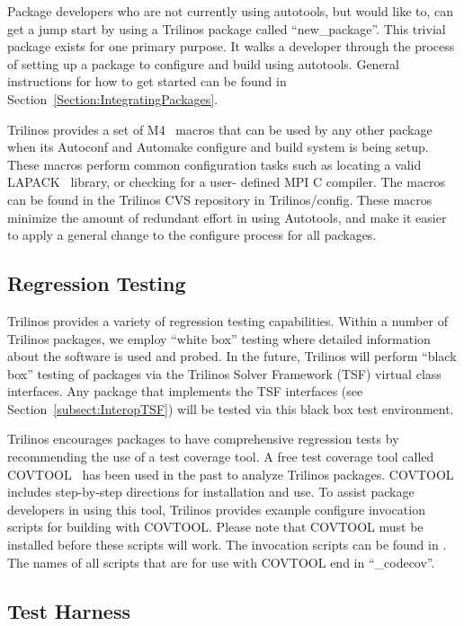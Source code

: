 \documentclass[12pt,relax]{TrilinosDevGuide}
\begin{document}
Package developers who are not currently using autotools, but would like
to, can get a jump start by using a Trilinos package called 
``new\_package''.  This trivial package exists for one primary purpose.  
It walks a developer through the process of setting up a package to 
configure and build using autotools.  General instructions for how to get 
started can be found in Section~\ref{Section:IntegratingPackages}.

Trilinos provides a set of M4~\cite{M4} macros that can be used by any other
package when its Autoconf and Automake configure and build system is being 
setup.  These macros perform common configuration tasks such as
locating a valid LAPACK~\cite{lapack} library, or checking for a user-
defined MPI C compiler.  The macros can be found in the Trilinos CVS 
repository in Trilinos/config.  These macros minimize the amount of redundant
 effort in using Autotools, and make it easier to apply a general change to 
the configure process for all packages.
\subsection{Regression Testing}
\label{subsect:RegressionTesting}
Trilinos provides a variety of regression
testing capabilities.  Within a number of Trilinos packages, we employ
``white box'' testing where detailed information about the software is
used and probed.  In the future, Trilinos will perform ``black box'' testing
of packages via the Trilinos Solver Framework (TSF) virtual class
interfaces.  Any package that implements the TSF interfaces (see
Section~\ref{subsect:InteropTSF}) will be tested via this black box
test environment.

Trilinos encourages packages to have comprehensive regression tests by 
recommending the use of a test coverage tool.  A free test coverage tool 
called COVTOOL~\cite{COVTOOL} has been used in the past to analyze Trilinos 
packages.  COVTOOL includes step-by-step directions for installation and use.
To assist package developers in using this tool, Trilinos provides example 
configure invocation scripts for building with COVTOOL.  Please note that 
COVTOOL must be installed before these scripts will work.  The invocation 
scripts can be found in .  The names of all 
scripts that are for use with COVTOOL end in ``\_codecov''.

\subsection{Test Harness}
\label{subsect:TestHarness}
\end{document}
